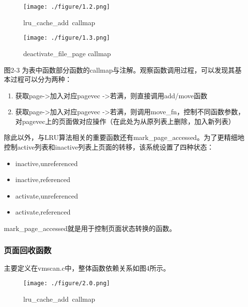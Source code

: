 \documentclass[11pt, a4paper, oneside,UTF8]{ctexart}
\begin{document}
\begin{figure}[h]
  \centering
  \texttt{[image: ./figure/1.2.png]}
  \caption{lru\_cache\_add\ callmap}
  \label{figure:1.2}
\end{figure}

\begin{figure}[h]
  \centering
  \texttt{[image: ./figure/1.3.png]}
  \caption{deactivate\_file\_page callmap}
  \label{figure:1.3}
\end{figure}


图2-3 为表中函数部分函数\footnotemark 的callmap与注解。观察函数调用过程，可以发现其基本过程可以分为两种：

\begin{enumerate}
  \setlength{\itemsep}{-0.5em}
  \item 获取page->加入对应pagevec ->若满，则直接调用add/move函数
  \item 获取page->加入对应pagevec ->若满，则调用move\_fn，控制不同函数参数，对pagevec上的页面做对应操作（在此处为从原列表上删除，加入新列表）
\end{enumerate}

除此以外，与LRU算法相关的重要函数还有mark\_page\_accessed。为了更精细地控制active列表和inactive列表上页面的转移，该系统设置了四种状态：
\begin{itemize}
  \setlength{\itemsep}{-0.5em}
  \item inactive,unreferenced
  \item inactive,referenced
  \item activate,unreferenced
  \item activate,referenced
\end{itemize}
mark\_page\_accessed就是用于控制页面状态转换的函数。

\subsubsection{页面回收函数}
主要定义在vmscan.c中，整体函数依赖关系如图4所示。
\begin{figure}[h]
  \centering
  \texttt{[image: ./figure/2.0.png]}
  \caption{lru\_cache\_add\ callmap}
  \label{figure:2.0}
\end{figure}
\end{document}
